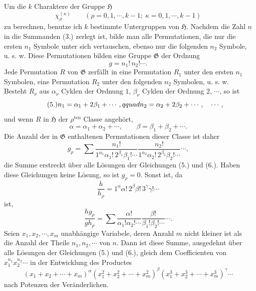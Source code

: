 \documentclass[11pt]{article}
\newcommand{\Hgr}{\mathfrak{H}}
\newcommand{\Ggr}{\mathfrak{G}}
\newcommand{\ten}{\mathrm{ten}}
\begin{document}
Um die $k$ Charaktere der Gruppe $\Hgr$
\[
 \chi_\rho^{(\kappa)}\qquad(\rho=0,1,\cdots,k-1;\ \kappa=0,1,\cdots,k-1)
\]
zu berechnen, benutze ich $k$ bestimmte Untergruppen von $\Hgr$. Nachdem die Zahl $n$ in die Summanden (3.) zerlegt ist, bilde man alle Permutationen, die nur die ersten $n_1$ Symbole unter sich vertauschen, ebenso nur die folgenden $n_2$ Symbole, u. s. w. Diese Permutationen bilden eine Gruppe $\Ggr$ der Ordnung
\begin{equation}\tag{4.}
 g=n_1!\,n_2!\cdots.
\end{equation}
Jede Permutation $R$ von $\Ggr$ zerfällt in eine Permutation $R_1$ unter den ersten $n_1$ Symbolen, eine Permutation $R_2$ unter den folgenden $n_2$ Symbolen, u. s. w. Besteht $R_\nu$ aus $\alpha_\nu$ Cyklen der Ordnung $1$, $\beta_\nu$ Cyklen der Ordnung $2$, $\cdots$, so ist
\begin{equation}\tag{5.}
 n_1=\alpha_1+2\beta_1+\cdots,\\qquad n_2=\alpha_2+2\beta_2+\cdots,\quad\cdots,
\end{equation}
und wenn $R$ in $\Hgr$ der $\rho^{\ten}$ Classe angehört,
\begin{equation}\tag{6.}
 \alpha=\alpha_1+\alpha_2+\cdots,\qquad \beta=\beta_1+\beta_2+\cdots.
\end{equation}
Die Anzahl der in $\Ggr$ enthaltenen Permutationen dieser Classe ist daher
\[
 g_\rho=\sum \frac{n_1!}{1^{\alpha_1}\alpha_1!\,2^{\beta_1}\beta_1!\cdots}
           \frac{n_2!}{1^{\alpha_2}\alpha_2!\,2^{\beta_2}\beta_2!\cdots}\cdots,
\]
die Summe erstreckt über alle Lösungen der Gleichungen (5.) und (6.). Haben diese Gleichungen keine Lösung, so ist $g_\rho=0$. Sonst ist, da
\begin{equation}\tag{7.}
 \frac{h}{h_\rho}=1^\alpha\alpha!\,2^\beta\beta!\,3^\gamma\gamma!\cdots
\end{equation}
ist,
\[
 \frac{h g_\rho}{g h_\rho}=\sum
 \frac{\alpha!}{\alpha_1!\alpha_2!\cdots}
 \frac{\beta!}{\beta_1!\beta_2!\cdots}\cdots.
\]
Seien $x_1,x_2,\cdots,x_m$ unabhängige Variabele, deren Anzahl $m$ nicht kleiner ist als die Anzahl der Theile $n_1,n_2,\cdots$ von $n$. Dann ist diese Summe, ausgedehnt über alle Lösungen der Gleichungen (5.) und (6.), gleich dem Coefficienten von $x_1^{n_1}x_2^{n_2}\cdots$ in der Entwicklung des Productes
\begin{equation}\tag{8.}
 (x_1+x_2+\cdots+x_m)^\alpha
 (x_1^2+x_2^2+\cdots+x_m^2)^\beta
 (x_1^3+x_2^3+\cdots+x_m^3)^\gamma\cdots
\end{equation}
nach Potenzen der Veränderlichen.
\end{document}
